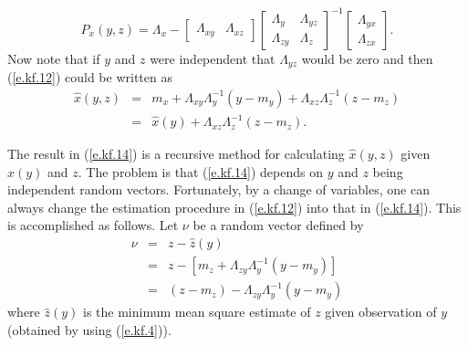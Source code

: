 %
\begin{equation}
P_x(y,z)=\Lambda_x-[\begin{array}{cc}
\Lambda_{xy}&\Lambda_{xz}\end{array}]
\left[\begin{array}{cc}\Lambda_y & \Lambda_{yz}\\
                       \Lambda_{zy} & \Lambda_{z}\end{array}\right]^{-1}
\left[\begin{array}{c}
\Lambda_{yx}\\\Lambda_{zx}\end{array}\right].
\label{e.kf.13}
\end{equation}
%
Now note that if $y$ and $z$ were independent that
$\Lambda_{yz}$ would be zero and then (\ref{e.kf.12}) could be written
as
%
\begin{eqnarray}
\hat{x}(y,z)&=&m_x+\Lambda_{xy}\Lambda_y^{-1}(y-m_y)+\Lambda_{xz}
\Lambda_z^{-1}(z-m_z)\nonumber\\
&=&\hat{x}(y)+\Lambda_{xz}\Lambda_z^{-1}(z-m_z).
\label{e.kf.14}
\end{eqnarray}
%

	The result in (\ref{e.kf.14}) is a recursive method for calculating
$\hat{x}(y,z)$ given $\hat{x}(y)$ and $z$.  The problem is that (\ref{e.kf.14})
depends on $y$ and $z$ being independent random vectors.
Fortunately, by a change of variables, one can always change the
estimation procedure in (\ref{e.kf.12}) into that in (\ref{e.kf.14}).
This is accomplished as follows.  Let $\nu$ be a random vector
defined by
%
\begin{eqnarray}
\nu&=&z-\hat{z}(y)\nonumber\\
   &=&z-[m_z+\Lambda_{zy}\Lambda_y^{-1}(y-m_y)]\nonumber\\
   &=&(z-m_z)-\Lambda_{zy}\Lambda_y^{-1}(y-m_y)
\label{e.kf.15}
\end{eqnarray}
%
where $\hat{z}(y)$ is the minimum mean square estimate of $z$
given observation of $y$ (obtained by using (\ref{e.kf.4})).

